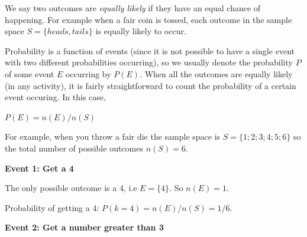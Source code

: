         
         \label{m39377*eip-953}We say two outcomes are \textsl{equally likely} if they have an equal chance of
happening. For example when a fair coin is tossed, each outcome in the sample
space \begin{math}S=\{heads,tails\}\end{math} is equally likely to occur.\par \label{m39377*eip-594}Probability is a function of events (since it is not possible to have a single event with two different probabilities occurring), so we usually denote the probability \begin{math}P\end{math} of some event \begin{math}E\end{math} occurring by \begin{math}P\left(E\right)\end{math}. When all the outcomes are equally likely (in any
activity), it is fairly straightforward to count the probability of a certain
event occuring. In this case,\par \label{m39377*eip-56}\begin{math}P\left(E\right)=n\left(E\right)/n\left(S\right)\end{math}\par 
        \label{m39377*eip-525}For example, when you throw a fair die the sample
space is \begin{math}S=\{1;2;3;4;5;6\}\end{math} so the total number of possible outcomes \begin{math}n\left(S\right)=6\end{math}.\par \label{m39377*id111979}\textbf{Event 1: Get a 4}
        \par 
        \label{m39377*id111985}The only possible outcome is a 
\begin{math}4\end{math}, i.e \begin{math}E=\{4\}\end{math}. So \begin{math}n\left(E\right)=1\end{math}.
\par 
        \label{m39377*id111992}Probability of getting a 4: \begin{math}P\left(k=4\right)=n\left(E\right)/n\left(S\right)=1/6\end{math}.\par 
        \label{m39377*id111998}\textbf{Event 2: Get a number greater than 3}
